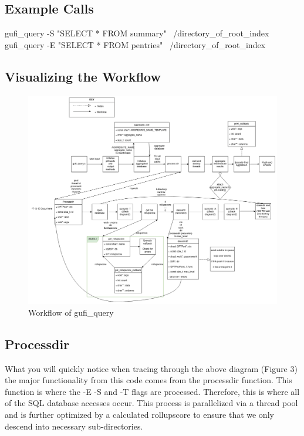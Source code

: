 \documentclass{article}
\begin{document}
\clearpage

\subsection{Example Calls}

gufi\_query -S "SELECT * FROM summary" ~/directory\_of\_root\_index
\\
gufi\_query -E "SELECT * FROM pentries" ~/directory\_of\_root\_index


\subsection{Visualizing the Workflow}


\begin{figure} [h]
\centering
\includegraphics[width=1.0\textwidth]{gufi_query.png}
\caption{\label{fig:gufi_query}Workflow of gufi\_query}
\end{figure}

\subsection{Processdir}
What you will quickly notice when tracing through the above diagram (Figure 3) the major functionality from this code comes from the processdir function. This function is where the -E -S and -T flags are processed. Therefore, this is where all of the SQL database accesses occur. This process is parallelized via a thread pool and is further optimized by a calculated rollupscore to ensure that we only descend into necessary sub-directories.
\end{document}
